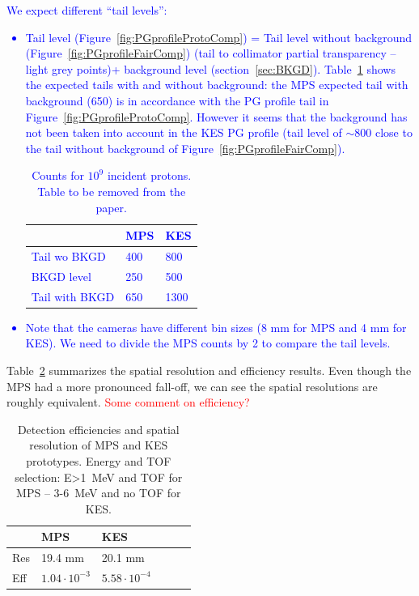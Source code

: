 \documentclass[a4paper,english,12pt]{article}
\newcommand{\bh}[2][red]{\textcolor{#1}{#2}}
\newcommand{\et}[2][blue]{\textcolor{#1}{#2}}
\begin{document}
\et{We expect different \enquote{tail levels}:
	\begin{itemize}
		\item Tail level (Figure~\ref{fig:PGprofileProtoComp}) = Tail level without background (Figure~\ref{fig:PGprofileFairComp}) (tail to collimator partial transparency -- light grey points)+ background level (section~\ref{sec:BKGD}). Table~\ref{tab:Tails} shows the expected tails with and without background: the MPS expected tail with background (650) is in accordance with the PG profile tail in Figure~\ref{fig:PGprofileProtoComp}. However it seems that the background has not been taken into account in the KES PG profile (tail level of $\sim800$ close to the tail without background of Figure~\ref{fig:PGprofileFairComp}).
		\begin{table}[h]
		\centering		
		\begin{tabular}{lll}
			\midrule
										& MPS			& KES \\
			\midrule
			Tail wo BKGD	& 400			& 800\\
			BKGD level  	& 250			& 500\\
			\midrule
			Tail with BKGD& 650			& 1300\\
			\midrule
		\end{tabular}		
		\caption{Counts for $10^9$ incident protons. \et{Table to be removed from the paper.}}
		\label{tab:Tails}
		\end{table}		
		\item Note that the cameras have different bin sizes (8 mm for MPS and 4 mm for KES). We need to divide the MPS counts by 2 to compare the tail levels.
	\end{itemize}
}


Table~\ref{tab:ProtoPerformance} summarizes the spatial resolution and efficiency results. Even though the MPS had a more pronounced fall-off, we can see the spatial resolutions are roughly equivalent. \bh{Some comment on efficiency?}


\begin{table}[h]
\centering
\begin{tabular}{llllll}
	\midrule
			& MPS					& KES \\
	\midrule
 	Res		& 19.4 mm				& 20.1 mm\\
	Eff  	& $1.04\cdot10^{-3}$	& $5.58\cdot10^{-4}$\\
 	\midrule
\end{tabular}
\caption{Detection efficiencies and spatial resolution of MPS and KES prototypes. Energy and TOF selection: E>1~MeV and TOF for MPS -- 3-6~MeV and no TOF for KES.}
\label{tab:ProtoPerformance}
\end{table}
\end{document}
